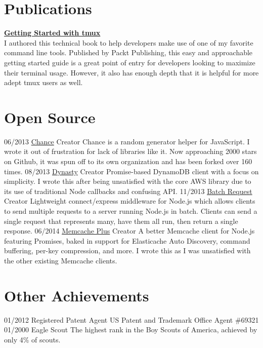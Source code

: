 \documentclass[]{friggeri-cv}
\begin{document}
\section{Publications}
\textbf{\href{http://gettingstartedwithtmux.com/}{Getting Started with tmux}}\\
{I authored this technical book to help developers make use of one of my favorite command line tools. Published by Packt Publishing, this easy and approachable getting started guide is a great point of entry for developers looking to maximize their terminal usage. However, it also has enough depth that it is helpful for more adept tmux users as well.}
\\
\section{Open Source}
\begin{entrylist}
  \entry
  {06/2013}
  {\href{http://chancejs.com}{Chance}}
  {Creator}
  {Chance is a random generator helper for JavaScript. I wrote it out of frustration for lack of libraries like it. Now approaching 2000 stars on Github, it was spun off to its own organization and has been forked over 160 times.}
  \entry
  {08/2013}
  {\href{http://dynastyjs.com}{Dynasty}}
  {Creator}
  {Promise-based DynamoDB client with a focus on simplicity. I wrote this after being unsatisfied with the core AWS library due to its use of traditional Node callbacks and confusing API.}
  \entry
  {11/2013}
  {\href{http://batch-request.socialradar.com}{Batch Request}}
  {Creator}
  {Lightweight connect/express middleware for Node.js which allows clients to send multiple requests to a server running Node.js in batch. Clients can send a single request that represents many, have them all run, then return a single response.}
  \entry
  {06/2014}
  {\href{http://memcache-plus.com/}{Memcache Plus}}
  {Creator}
  {A better Memcache client for Node.js featuring Promises, baked in support for Elasticache Auto Discovery, command buffering, per-key compression, and more. I wrote this as I was unsatisfied with the other existing Memcache clients.}
\end{entrylist}

\section{Other Achievements}
\begin{entrylist}
    \entry
    {01/2012}
    {Registered Patent Agent}
    {}
    {US Patent and Trademark Office Agent \#69321}
    \entry
    {01/2000}
    {Eagle Scout}
    {}
    {The highest rank in the Boy Scouts of America, achieved by only 4\% of scouts.}
\end{entrylist}
\\
\end{document}

